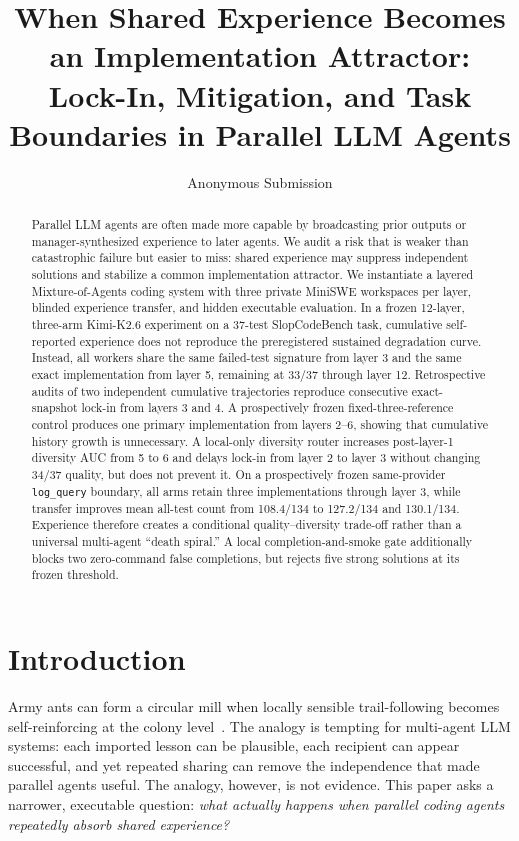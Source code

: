 \documentclass[letterpaper]{article}
\title{When Shared Experience Becomes an Implementation Attractor: Lock-In, Mitigation, and Task Boundaries in Parallel LLM Agents}
\author{Anonymous Submission}
\begin{document}
\maketitle

\begin{abstract}
Parallel LLM agents are often made more capable by broadcasting prior outputs or
manager-synthesized experience to later agents. We audit a risk that is weaker than
catastrophic failure but easier to miss: shared experience may suppress independent
solutions and stabilize a common implementation attractor. We instantiate a layered
Mixture-of-Agents coding system with three private MiniSWE workspaces per layer,
blinded experience transfer, and hidden executable evaluation. In a frozen
12-layer, three-arm Kimi-K2.6 experiment on a 37-test SlopCodeBench task, cumulative
self-reported experience does not reproduce the preregistered sustained
degradation curve. Instead, all workers share the same failed-test signature from
layer 3 and the same exact implementation from layer 5, remaining at 33/37 through
layer 12. Retrospective audits of two independent cumulative trajectories
reproduce consecutive exact-snapshot lock-in from layers 3 and 4. A prospectively
frozen fixed-three-reference control produces one primary implementation from
layers 2--6, showing that cumulative history growth is unnecessary. A local-only
diversity router increases post-layer-1 diversity AUC from 5 to 6 and delays
lock-in from layer 2 to layer 3 without changing 34/37 quality, but does not
prevent it. On a prospectively frozen same-provider \texttt{log\_query} boundary,
all arms retain three implementations through layer 3, while transfer improves
mean all-test count from 108.4/134 to 127.2/134 and 130.1/134. Experience
therefore creates a conditional quality--diversity trade-off rather than a
universal multi-agent ``death spiral.'' A local completion-and-smoke gate
additionally blocks two zero-command false completions, but rejects five strong
solutions at its frozen threshold.
\end{abstract}

\section{Introduction}

Army ants can form a circular mill when locally sensible trail-following becomes
self-reinforcing at the colony level~\citep{schneirla1944circularmill}. The analogy
is tempting for multi-agent LLM systems: each imported lesson can be plausible,
each recipient can appear successful, and yet repeated sharing can remove the
independence that made parallel agents useful. The analogy, however, is not
evidence. This paper asks a narrower, executable question: \emph{what actually
happens when parallel coding agents repeatedly absorb shared experience?}
\end{document}
